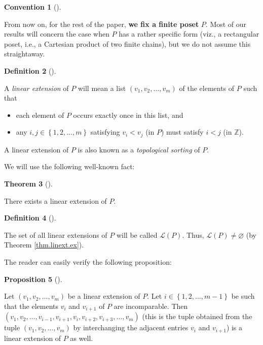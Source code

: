 \documentclass[numbers=enddot,12pt,final,onecolumn,notitlepage]{scrartcl}%
\theoremstyle{definition}
\newtheorem{theo}{Theorem}[section]
\newenvironment{theorem}[1][]
{\begin{theo}[#1]\begin{leftbar}}
{\end{leftbar}\end{theo}}
\newtheorem{prop}[theo]{Proposition}
\newenvironment{proposition}[1][]
{\begin{prop}[#1]\begin{leftbar}}
{\end{leftbar}\end{prop}}
\newtheorem{defi}[theo]{Definition}
\newenvironment{definition}[1][]
{\begin{defi}[#1]\begin{leftbar}}
{\end{leftbar}\end{defi}}
\newtheorem{conv}[theo]{Convention}
\newenvironment{convention}[1][]
{\begin{conv}[#1]\begin{leftbar}}
{\end{leftbar}\end{conv}}
\begin{document}
\begin{convention}
From now on, for the rest of the paper, \textbf{we fix a finite poset }$P$.
Most of our results will concern the case when $P$ has a rather specific form
(viz., a rectangular poset, i.e., a Cartesian product of two finite chains),
but we do not assume this straightaway.
\end{convention}

\begin{definition}
\label{def.linext}A \emph{linear extension} of $P$ will mean a list $\left(
v_{1},v_{2},\ldots,v_{m}\right)  $ of the elements of $P$ such that

\begin{itemize}
\item each element of $P$ occurs exactly once in this list, and

\item any $i,j\in\left\{  1,2,\ldots,m\right\}  $ satisfying $v_{i}<v_{j}$ (in
$P$) must satisfy $i<j$ (in $\mathbb{Z}$).
\end{itemize}
\end{definition}

A linear extension of $P$ is also known as a \emph{topological sorting} of $P$.

We will use the following well-known fact:

\begin{theorem}
\label{thm.linext.ex}There exists a linear extension of $P$.
\end{theorem}

\begin{definition}
\label{def.L(P)}The set of all linear extensions of $P$ will be called
$\mathcal{L}\left(  P\right)  $. Thus, $\mathcal{L}\left(  P\right)
\neq\varnothing$ (by Theorem \ref{thm.linext.ex}).
\end{definition}

The reader can easily verify the following proposition:

\begin{proposition}
\label{prop.linext.switch}Let $\left(  v_{1},v_{2},\ldots,v_{m}\right)  $ be a
linear extension of $P$. Let $i\in\left\{  1,2,\ldots,m-1\right\}  $ be such
that the elements $v_{i}$ and $v_{i+1}$ of $P$ are incomparable. Then $\left(
v_{1},v_{2},\ldots,v_{i-1},v_{i+1},v_{i},v_{i+2},v_{i+3},\ldots,v_{m}\right)
$ (this is the tuple obtained from the tuple $\left(  v_{1},v_{2},\ldots
,v_{m}\right)  $ by interchanging the adjacent entries $v_{i}$ and $v_{i+1}$)
is a linear extension of $P$ as well.
\end{proposition}
\end{document}
